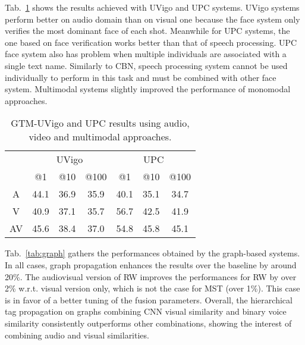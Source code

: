  Tab.~\ref{tab:verification} shows the results achieved with UVigo and UPC systems. UVigo systems perform better on audio domain than on visual one because the face system only verifies the most dominant face of each shot.
%
Meanwhile for UPC systems, the one based on face verification works better than that of speech processing. UPC face system also has problem when multiple individuals are associated with a single text name. Similarly to CBN, speech processing system cannot be used individually to perform in this task and must be combined with other face system.
%
Multimodal systems slightly improved the performance of monomodal approaches.

\begin{table}[tb]
\centering
\caption{GTM-UVigo and UPC results using audio, video and multimodal approaches.}
\vspace*{-2mm}
\begin{tabular}{c|c|c|c|| c|c|c|}
\cline{2-7}
  &  \multicolumn{3}{|c||}{UVigo} &  \multicolumn{3}{|c|}{UPC} \\ \cline{2-7}
           & @1& @10& @100   & @1& @10& @100 \\ \hline
 \multicolumn{1}{|c|}{A} &  44.1  & 36.9   & 35.9  &  40.1  & 35.1   & 34.7\\ \hline
 \multicolumn{1}{|c|}{V} &  40.9  & 37.1   & 35.7 &  56.7  & 42.5   & 41.9 \\ \hline
 \multicolumn{1}{|c|}{AV} & 45.6 & 38.4 & 37.0 & 54.8 & 45.8 & 45.1 \\ \hline
\end{tabular}
%
\vspace*{-5mm}
\label{tab:verification}
\end{table}

 Tab.~\ref{tab:graph} gathers the performances obtained by the graph-based systems. In all cases, graph propagation enhances the results over the baseline by around 20\%. The audiovisual version of RW improves the performances for RW by over 2\% w.r.t. visual version only, which is not the case for MST (over 1\%). This case is in favor of a better tuning of the fusion parameters.
%
Overall, the hierarchical tag propagation on graphs  combining  CNN  visual  similarity  and  binary  voice similarity consistently outperforms other combinations, showing the interest of combining audio and visual similarities.  


